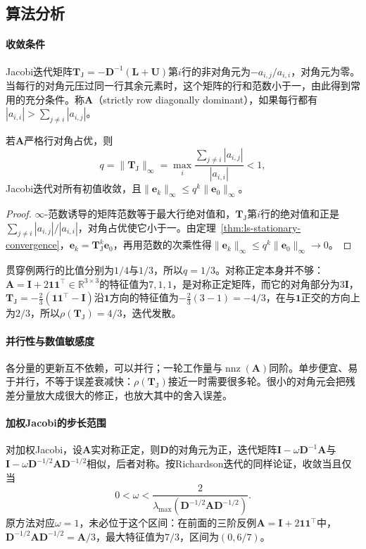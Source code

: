 \subsection{算法分析}

\paragraph{收敛条件}
Jacobi迭代矩阵$\bm T_{\mathrm J}=-\bm D^{-1}(\bm L+\bm U)$第$i$行的非对角元为$-a_{i,j}/a_{i,i}$，对角元为零。当每行的对角元压过同一行其余元素时，这个矩阵的行和范数小于一，由此得到常用的充分条件。称$\bm A$（strictly row diagonally dominant），如果每行都有$|a_{i,i}|>\sum_{j\neq i}|a_{i,j}|$。
\begin{theorem}[Jacobi迭代的收敛条件]
\label{thm:ls-jacobi-convergence}
若$\bm A$严格行对角占优，则
\[
q=\lVert\bm T_{\mathrm J}\rVert_\infty=\max_i\frac{\sum_{j\neq i}|a_{i,j}|}{|a_{i,i}|}<1,
\]
Jacobi迭代对所有初值收敛，且$\lVert\bm e_k\rVert_\infty\leq q^k\lVert\bm e_0\rVert_\infty$。
\end{theorem}
\begin{proof}
$\infty$-范数诱导的矩阵范数等于最大行绝对值和，$\bm T_{\mathrm J}$第$i$行的绝对值和正是$\sum_{j\neq i}|a_{i,j}|/|a_{i,i}|$，对角占优使它小于一。由定理~\ref{thm:ls-stationary-convergence}，$\bm e_k=\bm T_{\mathrm J}^k\bm e_0$，再用范数的次乘性得$\lVert\bm e_k\rVert_\infty\leq q^k\lVert\bm e_0\rVert_\infty\to0$。
\end{proof}
贯穿例两行的比值分别为$1/4$与$1/3$，所以$q=1/3$。对称正定本身并不够：$\bm A=\bm I+2\bm 1\bm 1^\top\in\mathbb R^{3\times3}$的特征值为$7,1,1$，是对称正定矩阵，而它的对角部分为$3\bm I$，$\bm T_{\mathrm J}=-\tfrac23(\bm 1\bm 1^\top-\bm I)$沿$\bm 1$方向的特征值为$-\tfrac23(3-1)=-4/3$，在与$\bm 1$正交的方向上为$2/3$，所以$\rho(\bm T_{\mathrm J})=4/3$，迭代发散。

\paragraph{并行性与数值敏感度}
各分量的更新互不依赖，可以并行；一轮工作量与$\operatorname{nnz}(\bm A)$同阶。单步便宜、易于并行，不等于误差衰减快：$\rho(\bm T_{\mathrm J})$接近一时需要很多轮。很小的对角元会把残差分量放大成很大的修正，也放大其中的舍入误差。

\paragraph{加权Jacobi的步长范围}
对加权Jacobi，设$\bm A$实对称正定，则$\bm D$的对角元为正，迭代矩阵$\bm I-\omega\bm D^{-1}\bm A$与$\bm I-\omega\bm D^{-1/2}\bm A\bm D^{-1/2}$相似，后者对称。按Richardson迭代的同样论证，收敛当且仅当
\[
0<\omega<\frac{2}{\lambda_{\max}(\bm D^{-1/2}\bm A\bm D^{-1/2})}.
\]
原方法对应$\omega=1$，未必位于这个区间：在前面的三阶反例$\bm A=\bm I+2\bm 1\bm 1^\top$中，$\bm D^{-1/2}\bm A\bm D^{-1/2}=\bm A/3$，最大特征值为$7/3$，区间为$(0,6/7)$。

